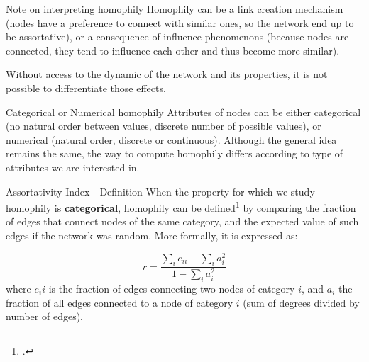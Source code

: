 \begin{textbox}{Note on interpreting homophily}
    Homophily can be a link creation mechanism (nodes have a preference to connect with similar ones, so the network end up to be assortative), or a consequence of influence phenomenons (because nodes are connected, they tend to influence each other and thus become more similar).

    Without access to the dynamic of the network and its properties, it is not possible to differentiate those effects.
\end{textbox}


\begin{textbox}{Categorical or Numerical homophily}
    Attributes of nodes can be either categorical (no natural order between values, discrete number of possible values), or numerical (natural order, discrete or continuous). Although the general idea remains the same, the way to compute homophily differs according to type of attributes we are interested in.
\end{textbox}


\begin{textbox}{Assortativity Index - Definition}
    When the property for which we study homophily is \textbf{categorical}, homophily can be defined\footcite{newman2003mixing} by comparing the fraction of edges that connect nodes of the same category, and the expected value of such edges if the network was random. More formally, it is expressed as:

    \[
        r=\frac{\sum_i e_{ii} - \sum_i a_i^2}{1- \sum_i a_i^2}
    \]
    where $e_ii$ is the fraction of edges connecting two nodes of category $i$, and $a_i$ the fraction of all edges connected to a node of category $i$ (sum of degrees divided by number of edges).
\end{textbox}


